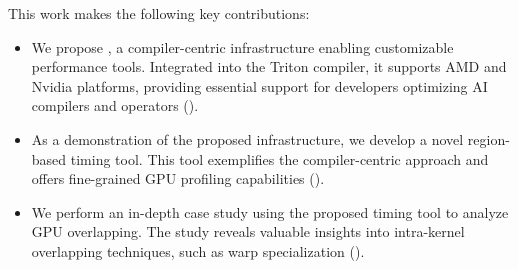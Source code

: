 This work makes the following key contributions:
\begin{itemize}
    \itemsep0em 
    \item We propose \thiswork{}, a compiler-centric infrastructure enabling customizable performance tools. Integrated into the Triton compiler, it supports AMD and Nvidia platforms, providing essential support for developers optimizing AI compilers and operators (\Sec{\ref{sec:compiler_centric}}).
    \item As a demonstration of the proposed infrastructure, we develop a novel region-based timing tool. This tool exemplifies the compiler-centric approach and offers fine-grained GPU profiling capabilities (\Sec{\ref{sec:tool}}).
    \item We perform an in-depth case study using the proposed timing tool to analyze GPU overlapping. The study reveals valuable insights into intra-kernel overlapping techniques, such as warp specialization (\Sec{\ref{sec:evaluation}}).
\end{itemize}